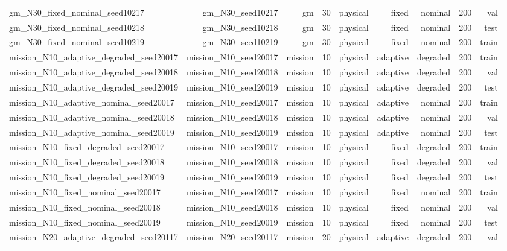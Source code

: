 \begin{tabular}{lrrrrrrrr}
gm\_N30\_fixed\_nominal\_seed10217 & gm\_N30\_seed10217 & gm & 30 & physical & fixed & nominal & 200 & val \\
gm\_N30\_fixed\_nominal\_seed10218 & gm\_N30\_seed10218 & gm & 30 & physical & fixed & nominal & 200 & test \\
gm\_N30\_fixed\_nominal\_seed10219 & gm\_N30\_seed10219 & gm & 30 & physical & fixed & nominal & 200 & train \\
mission\_N10\_adaptive\_degraded\_seed20017 & mission\_N10\_seed20017 & mission & 10 & physical & adaptive & degraded & 200 & train \\
mission\_N10\_adaptive\_degraded\_seed20018 & mission\_N10\_seed20018 & mission & 10 & physical & adaptive & degraded & 200 & val \\
mission\_N10\_adaptive\_degraded\_seed20019 & mission\_N10\_seed20019 & mission & 10 & physical & adaptive & degraded & 200 & test \\
mission\_N10\_adaptive\_nominal\_seed20017 & mission\_N10\_seed20017 & mission & 10 & physical & adaptive & nominal & 200 & train \\
mission\_N10\_adaptive\_nominal\_seed20018 & mission\_N10\_seed20018 & mission & 10 & physical & adaptive & nominal & 200 & val \\
mission\_N10\_adaptive\_nominal\_seed20019 & mission\_N10\_seed20019 & mission & 10 & physical & adaptive & nominal & 200 & test \\
mission\_N10\_fixed\_degraded\_seed20017 & mission\_N10\_seed20017 & mission & 10 & physical & fixed & degraded & 200 & train \\
mission\_N10\_fixed\_degraded\_seed20018 & mission\_N10\_seed20018 & mission & 10 & physical & fixed & degraded & 200 & val \\
mission\_N10\_fixed\_degraded\_seed20019 & mission\_N10\_seed20019 & mission & 10 & physical & fixed & degraded & 200 & test \\
mission\_N10\_fixed\_nominal\_seed20017 & mission\_N10\_seed20017 & mission & 10 & physical & fixed & nominal & 200 & train \\
mission\_N10\_fixed\_nominal\_seed20018 & mission\_N10\_seed20018 & mission & 10 & physical & fixed & nominal & 200 & val \\
mission\_N10\_fixed\_nominal\_seed20019 & mission\_N10\_seed20019 & mission & 10 & physical & fixed & nominal & 200 & test \\
mission\_N20\_adaptive\_degraded\_seed20117 & mission\_N20\_seed20117 & mission & 20 & physical & adaptive & degraded & 200 & val \\

\end{tabular}
